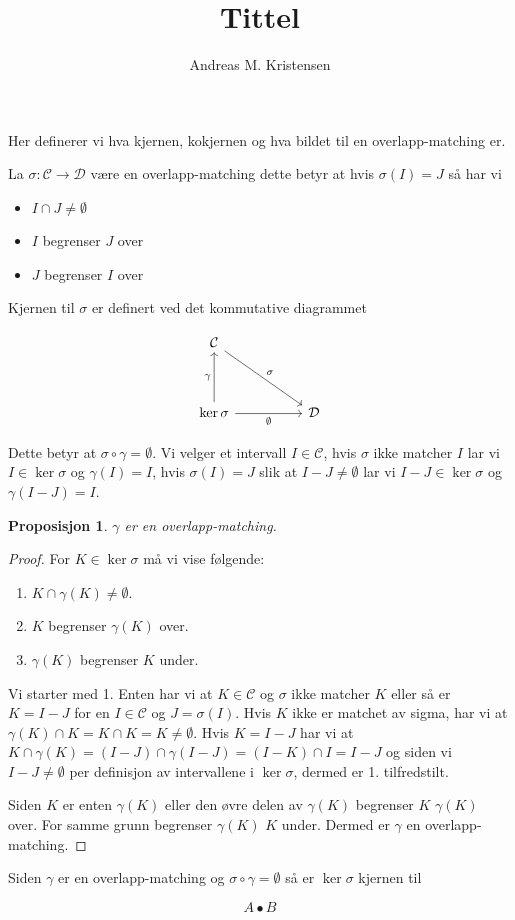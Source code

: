 \documentclass{article}
\title{Tittel}
\author{Andreas M. Kristensen}
\newcommand{\es}{\emptyset}
\newcommand{\Dcal}{\mathcal{D}}
\newcommand{\Ccal}{\mathcal{C}}
\newtheorem{proposition}{Proposisjon}[subsection]
\begin{document}
\maketitle
Her definerer vi hva kjernen, kokjernen og hva bildet til en overlapp-matching er.

La $\sigma:\Ccal\to\Dcal$ være en overlapp-matching dette betyr at hvis $\sigma(I)=J$ så har vi

\begin{itemize}
  \item $I\cap J\neq\es$
  \item $I$ begrenser $J$ over
  \item $J$ begrenser $I$ over
\end{itemize}

Kjernen til $\sigma$ er definert ved det kommutative diagrammet

\[\begin{tikzcd}
	\Ccal \\
	\\
	\ker\sigma && \Dcal
	\arrow["\sigma", from=1-1, to=3-3]
	\arrow["\gamma", from=3-1, to=1-1]
	\arrow["\es"', from=3-1, to=3-3]
\end{tikzcd}\]

Dette betyr at $\sigma\circ\gamma = \es$. Vi velger et intervall $I\in\Ccal$, hvis $\sigma$ ikke matcher $I$ lar vi
$I\in\ker\sigma$ og $\gamma(I)=I$, hvis $\sigma(I)=J$ slik at $I-J\neq\es$ lar vi $I-J\in\ker\sigma$ og
$\gamma(I-J)=I$.

\begin{proposition}\label{prop:gamOM}
  $\gamma$ er en overlapp-matching.
\end{proposition}
\begin{proof}
  For $K\in\ker\sigma$ må vi vise følgende:
  \begin{enumerate}
    \item $K\cap\gamma(K)\neq\es$.
    \item $K$ begrenser $\gamma(K)$ over.
    \item $\gamma(K)$ begrenser $K$ under.
  \end{enumerate}

  Vi starter med 1. Enten har vi at $K\in\Ccal$ og $\sigma$ ikke matcher $K$ eller så er $K=I-J$ for en
  $I\in\Ccal$ og $J=\sigma(I)$. Hvis $K$ ikke er matchet av sigma, har vi at $\gamma(K)\cap K = K\cap
  K = K\neq\es$. Hvis $K = I-J$ har vi at $K\cap\gamma(K) = (I-J)\cap\gamma(I-J) = (I-K)\cap I = I-J$ og siden vi
  $I-J\neq\es$ per definisjon av intervallene i $\ker\sigma$, dermed er 1. tilfredstilt.

  Siden $K$ er enten $\gamma(K)$ eller den øvre delen av $\gamma(K)$ begrenser $K$ $\gamma(K)$ over. For samme
  grunn begrenser $\gamma(K)$ $K$ under.
  Dermed er $\gamma$ en overlapp-matching.
\end{proof}

Siden $\gamma$ er en overlapp-matching og $\sigma\circ\gamma = \es$ så er $\ker\sigma$ kjernen til



\[A\bullet B\]
\end{document}

